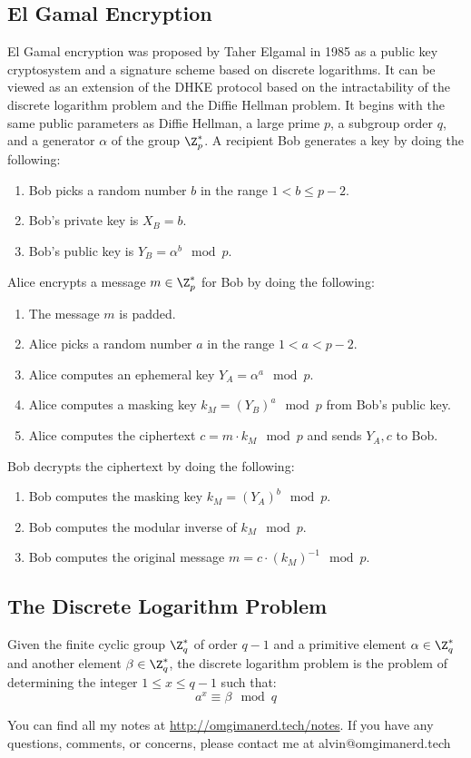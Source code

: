 \documentclass{math}
\begin{document}
\subsection*{El Gamal Encryption}
El Gamal encryption was proposed by Taher Elgamal in 1985 as a public key
cryptosystem and a signature scheme based on discrete logarithms. It can
be viewed as an extension of the DHKE protocol based on the intractability of
the discrete logarithm problem and the Diffie Hellman problem. It begins
with the same public parameters as Diffie Hellman, a large prime \( p \),
a subgroup order \( q \), and a generator \( \alpha \) of the group
\( \Z_p^{*} \). A recipient Bob generates a key by doing the following:
\begin{enumerate}
  \item Bob picks a random number \( b \) in the range \( 1<b\le p-2 \).
  \item Bob's private key is \( X_B = b \).
  \item Bob's public key is \( Y_B = \alpha^b\mod p \).
\end{enumerate}
Alice encrypts a message \( m\in\Z_p^{*} \) for Bob by doing the following:
\begin{enumerate}
  \item The message \( m \) is padded.
  \item Alice picks a random number \( a \) in the range \( 1<a<p-2 \).
  \item Alice computes an ephemeral key \( Y_A = \alpha^a\mod p \).
  \item Alice computes a masking key \( k_M = (Y_B)^a\mod p \) from Bob's
  public key.
  \item Alice computes the ciphertext \( c = m\cdot k_M\mod p \) and sends
  \( Y_A, c \) to Bob.
\end{enumerate}
Bob decrypts the ciphertext by doing the following:
\begin{enumerate}
  \item Bob computes the masking key \( k_M = (Y_A)^b\mod p \).
  \item Bob computes the modular inverse of \( k_M\mod p \).
  \item Bob computes the original message \( m = c\cdot (k_M)^{-1}\mod p \).
\end{enumerate}

\subsection*{The Discrete Logarithm Problem}
Given the finite cyclic group \( \Z_q^* \) of order \( q-1 \) and a primitive
element \( \alpha\in\Z_q^* \) and another element \( \beta\in\Z_q^* \), the
discrete logarithm problem is the problem of determining the integer
\( 1\le x\le q-1 \) such that:
\[ a^x\equiv\beta\mod q \]

\begin{center}
  You can find all my notes at \url{http://omgimanerd.tech/notes}. If you have
  any questions, comments, or concerns, please contact me at
  alvin@omgimanerd.tech
\end{center}
\end{document}
